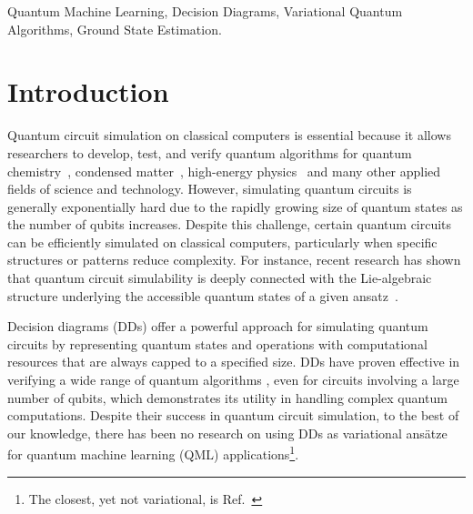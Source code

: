 \documentclass{ieeeaccess}
\begin{document}
\begin{keywords}
Quantum Machine Learning, Decision Diagrams, Variational Quantum Algorithms, Ground State Estimation.
\end{keywords}

\maketitle
\section{Introduction}

Quantum circuit simulation on classical computers is essential because it allows researchers to develop, test, and verify quantum algorithms for quantum chemistry~\cite{mazzola2024quantum}, condensed matter~\cite{Bassman_Oftelie_2021}, high-energy physics~\cite{meglio2024quantum} and many other applied fields of science and technology.
However, simulating quantum circuits is generally exponentially hard due to the rapidly growing size of quantum states as the number of qubits increases.
Despite this challenge, certain quantum circuits can be efficiently simulated on classical computers, particularly when specific structures or patterns reduce complexity.
For instance, recent research has shown that quantum circuit simulability is deeply connected with the Lie-algebraic structure underlying the accessible quantum states of a given ansatz~\cite{goh2023liealgebraicclassicalsimulationsvariational,ragone2024lie,bermejo2024quantumconvolutionalneuralnetworks,kazi2024analyzingquantumapproximateoptimization}.


Decision diagrams (DDs) offer a powerful approach for simulating quantum circuits by representing quantum states and operations with computational resources that are always capped to a specified size.
DDs have proven effective in verifying a wide range of quantum algorithms \cite{zulehner2018advancedsim,hillmich2020fastweaksim,hillmich2021asaccurateasneeded,burgholzer2021hybridshrodingerfeynman,burgholzer2022exploitingarbitrarypaths,grurl2023noiseaware}, even for circuits involving a large number of qubits, which demonstrates its utility in handling complex quantum computations.
Despite their success in quantum circuit simulation, to the best of our knowledge, there has been no research on using DDs as variational ansätze for quantum machine learning (QML) applications\footnote{The closest, yet not variational, is Ref.~\cite{tanaka2024quantumstatepreparationfree}}.
\end{document}
